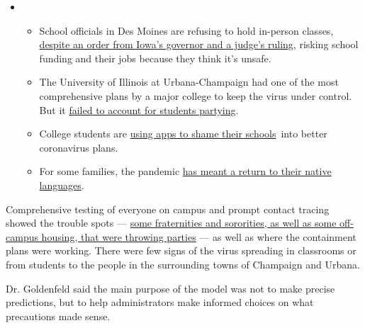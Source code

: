 \begin{itemize}
\item
  \begin{itemize}
  \tightlist
  \item
    School officials in Des Moines are refusing to hold in-person
    classes,
    \href{https://www.nytimes3xbfgragh.onion/2020/09/10/us/des-moines-school-opening-coronavirus.html?action=click\&pgtype=Article\&state=default\&region=MAIN_CONTENT_3\&context=storylines_keepup}{despite
    an order from Iowa's governor and a judge's ruling}, risking school
    funding and their jobs because they think it's unsafe.
  \item
    The University of Illinois at Urbana-Champaign had one of the most
    comprehensive plans by a major college to keep the virus under
    control. But it
    \href{https://www.nytimes3xbfgragh.onion/2020/09/10/health/university-illinois-covid.html?action=click\&pgtype=Article\&state=default\&region=MAIN_CONTENT_3\&context=storylines_keepup}{failed
    to account for students partying}.
  \item
    College students are
    \href{https://www.nytimes3xbfgragh.onion/2020/09/10/technology/coronavirus-quarantines-college.html?action=click\&pgtype=Article\&state=default\&region=MAIN_CONTENT_3\&context=storylines_keepup}{using
    apps to shame their schools}~into better coronavirus plans.
  \item
    For some families, the pandemic
    \href{https://www.nytimes3xbfgragh.onion/2020/09/10/parenting/family-second-language-coronavirus.html?action=click\&pgtype=Article\&state=default\&region=MAIN_CONTENT_3\&context=storylines_keepup}{has
    meant a return to their native languages}.
  \end{itemize}
\end{itemize}

Comprehensive testing of everyone on campus and prompt contact tracing
showed the trouble spots ---
\href{https://dailyillini.com/news/2020/09/09/greek-private-housing-becomes-center-of-campus-spread/}{some
fraternities and sororities, as well as some off-campus housing, that
were throwing parties} --- as well as where the containment plans were
working. There were few signs of the virus spreading in classrooms or
from students to the people in the surrounding towns of Champaign and
Urbana.

Dr. Goldenfeld said the main purpose of the model was not to make
precise predictions, but to help administrators make informed choices on
what precautions made sense.

